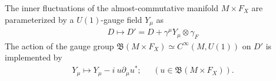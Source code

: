 \begin{proposition}
    The inner fluctuations of the almost-commutative manifold $M\times
    F_X$ are parameterized by a $U(1)$-gauge field $Y_\mu$ as
    \begin{align}
        D \mapsto D' = D + \gamma ^\mu Y_\mu \otimes \gamma_F
    \end{align}
    The action of the gauge group $\mathfrak{B}(M\times F_X) \simeq
    C^\infty (M, U(1))$ on $D'$ is implemented by
    \begin{align}
        Y_\mu \mapsto Y_\mu - i\ u\partial_\mu u^*; \;\;\;\;\; (u\in
        \mathfrak{B}(M\times F_X)).
    \end{align}
\end{proposition}

